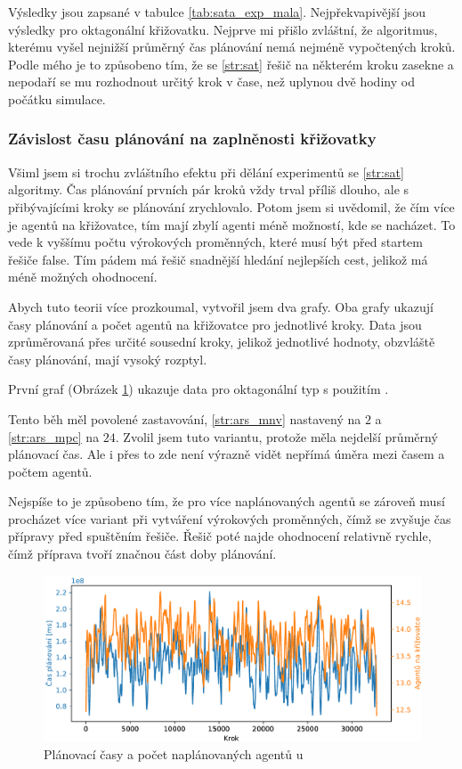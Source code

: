 Výsledky jsou zapsané v tabulce \ref{tab:sata_exp_mala}.
Nejpřekvapivější jsou výsledky pro oktagonální křižovatku.
Nejprve mi přišlo zvláštní, že algoritmus, kterému vyšel nejnižší průměrný čas plánování nemá nejméně vypočtených kroků.
Podle mého je to způsobeno tím, že se \ref{str:sat} řešič na některém kroku zasekne a nepodaří se mu rozhodnout
určitý krok v čase, než uplynou dvě hodiny od počátku simulace.



\subsubsection{Závislost času plánování na zaplněnosti křižovatky}
\label{subsubsec:sat_zavislost_casu_a_agentu}

Všiml jsem si trochu zvláštního efektu při dělání experimentů se \ref{str:sat} algoritmy.
Čas plánování prvních pár kroků vždy trval příliš dlouho, ale s přibývajícími kroky se plánování zrychlovalo.
Potom jsem si uvědomil, že čím více je agentů na křižovatce, tím mají zbylí agenti méně možností, kde se nacházet.
To vede k vyššímu počtu výrokových proměnných, které musí být před startem řešiče \textrm{false}.
Tím pádem má řešič snadnější hledání nejlepších cest, jelikož má méně možných ohodnocení.

Abych tuto teorii více prozkoumal, vytvořil jsem dva grafy.
Oba grafy ukazují časy plánování a počet agentů na křižovatce pro jednotlivé kroky.
Data jsou zprůměrovaná přes určité sousední kroky, jelikož jednotlivé hodnoty,
obzvláště časy plánování, mají vysoký rozptyl.

První graf (Obrázek \ref{fig:cas_vs_agenti_satrsg}) ukazuje data pro oktagonální typ s použitím .

Tento běh měl povolené zastavování, \ref{str:ars_mnv} nastavený na $2$ a \ref{str:ars_mpc} na $24$.
Zvolil jsem tuto variantu, protože měla nejdelší průměrný plánovací čas.
Ale i přes to zde není výrazně vidět nepřímá úměra mezi časem a počtem agentů.

Nejspíše to je způsobeno tím, že pro více naplánovaných agentů se zároveň musí procházet více variant
při vytváření výrokových proměnných, čímž se zvyšuje čas přípravy před spuštěním řešiče.
Řešič poté najde ohodnocení relativně rychle, čímž příprava tvoří značnou část doby plánování.

\begin{figure}[h]
	\centering
	\includegraphics[width=140mm]{../img/CasVsAgentiSATRSG}
	\caption{Plánovací časy a počet naplánovaných agentů u }
	\label{fig:cas_vs_agenti_satrsg}
\end{figure}

